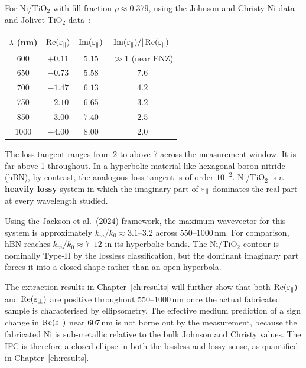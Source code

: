 For Ni/TiO$_2$ with fill fraction $\rho \approx 0.379$, using the Johnson
and Christy Ni data~\cite{johnson_christy} and Jolivet TiO$_2$
data~\cite{jolivet}:

\begin{center}
\begin{tabular}{cccc}
\toprule
$\lambda$ (nm) & $\operatorname{Re}(\varepsilon_{\parallel})$ & $\operatorname{Im}(\varepsilon_{\parallel})$ &
  $\operatorname{Im}(\varepsilon_{\parallel})/|\operatorname{Re}(\varepsilon_{\parallel})|$ \\
\midrule
600  & $+0.11$ & $5.15$ & $\gg 1$ (near ENZ) \\
650  & $-0.73$ & $5.58$ & $7.6$  \\
700  & $-1.47$ & $6.13$ & $4.2$  \\
750  & $-2.10$ & $6.65$ & $3.2$  \\
850  & $-3.00$ & $7.40$ & $2.5$  \\
1000 & $-4.00$ & $8.00$ & $2.0$  \\
\bottomrule
\end{tabular}
\end{center}

The loss tangent ranges from 2 to above 7 across the measurement window.
It is far above 1 throughout. In a hyperbolic material like hexagonal boron
nitride (hBN), by contrast, the analogous loss tangent is of order $10^{-2}$.
Ni/TiO$_2$ is a \textbf{heavily lossy} system in which the imaginary part of
$\varepsilon_{\parallel}$ dominates the real part at every wavelength studied.

Using the Jackson et al.\ (2024) framework, the maximum wavevector for this
system is approximately $k_m/k_0 \approx 3.1$--$3.2$ across $550$--$1000$\,nm.
For comparison, hBN reaches $k_m/k_0 \approx 7$--$12$ in its hyperbolic bands.
The Ni/TiO$_2$ contour is nominally Type-II by the lossless classification,
but the dominant imaginary part forces it into a closed shape rather than an
open hyperbola.

The extraction results in Chapter~\ref{ch:results} will further show that
both $\operatorname{Re}(\varepsilon_{\parallel})$ and $\operatorname{Re}(\varepsilon_{\perp})$ are positive throughout $550$--$1000$\,nm
once the actual fabricated sample is characterised by ellipsometry. The
effective medium prediction of a sign change in $\operatorname{Re}(\varepsilon_{\parallel})$ near $607$\,nm
is not borne out by the measurement, because the fabricated Ni is sub-metallic
relative to the bulk Johnson and Christy values. The IFC is therefore a closed
ellipse in both the lossless and lossy sense, as quantified in
Chapter~\ref{ch:results}.

